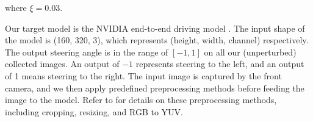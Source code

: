 where $\xi = 0.03$.

Our target model is the NVIDIA end-to-end driving model \citep{bojarski2016end}. The input shape of the model is (160, 320, 3), which represents (height, width, channel) respectively. The output steering angle is in the range of $[-1, 1]$ on all our (unperturbed) collected images. An output of $-1$ represents steering to the left, and an output of 1 means steering to the right. The input image is captured by the front camera, and we then apply predefined preprocessing methods before feeding the image to the model. Refer to \citep{bojarski2016end} for details on these preprocessing methods, including cropping, resizing, and RGB to YUV. 



